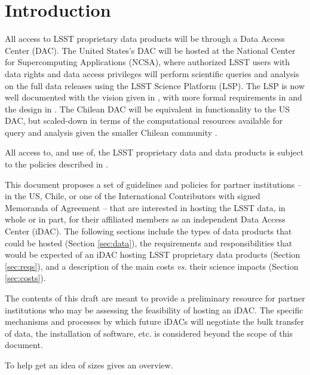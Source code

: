 
\section{Introduction}\label{sec:intro}

All access to LSST proprietary data products will be through a Data Access Center (DAC). The United States's DAC will be hosted at the National Center for Supercomputing Applications (NCSA), where authorized LSST users with data rights and data access privileges will perform scientific queries and analysis on the full data releases using the LSST Science Platform (LSP). The LSP is now well documented with the vision given in , with more formal requirements in  and the design in . The Chilean DAC will be equivalent in functionality to the US DAC, but scaled-down in terms of the computational resources available for query and analysis given the smaller Chilean community .

All access to, and use of, the LSST proprietary data and data products is subject to the policies described in .

This document proposes a set of guidelines and policies for partner institutions -- in the US, Chile, or one of the International Contributors with signed Memoranda of Agreement -- that are interested in hosting the LSST data, in whole or in part, for their affiliated members as an independent Data Access Center (iDAC). The following sections include the types of data products that could be hosted (Section \ref{sec:data}), the requirements and responsibilities that would be expected of an iDAC hosting LSST proprietary data products (Section \ref{sec:reqs}), and a description of the main costs {\it vs.} their science impacts (Section \ref{sec:costs}).

The contents of this draft are meant to provide a preliminary resource for partner institutions who may be assessing the feasibility of hosting an iDAC. The specific mechanisms and processes by which future iDACs will negotiate the bulk transfer of data, the installation of software, etc. is considered beyond the scope of this document.

To help get an idea of sizes  gives an overview.

